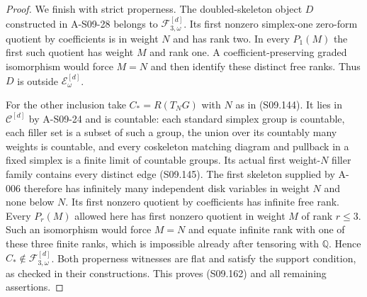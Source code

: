 \begin{proof}
We finish with strict properness. The doubled-skeleton object
$D$ constructed in A-S09-28 belongs to
$\mathcal F_{3,\omega}^{[d]}$. Its first nonzero
simplex-one zero-form quotient by coefficients is in
weight $N$ and has rank two. In every $P_1(M)$ the
first such quotient has weight $M$ and rank one.
A coefficient-preserving graded isomorphism would force
$M=N$ and then identify these distinct free ranks.
Thus $D$ is outside $\mathcal E_\omega^{[d]}$.

For the other inclusion take $C_*=R(T_NG)$ with $N$
as in (S09.144). It lies in $\mathcal C^{[d]}$ by
A-S09-24 and is countable: each standard simplex group
is countable, each filler set is a subset of such a
group, the union over its countably many weights is
countable, and every coskeleton matching diagram and
pullback in a fixed simplex is a finite limit of
countable groups. Its actual first weight-$N$ filler
family contains every distinct edge (S09.145).
The first skeleton supplied by A-006 therefore has
infinitely many independent disk variables in weight
$N$ and none below $N$. Its first nonzero quotient
by coefficients has infinite free rank. Every
$P_r(M)$ allowed here has first nonzero quotient in
weight $M$ of rank $r\leq3$. Such an isomorphism
would force $M=N$ and equate infinite rank with one
of these three finite ranks, which is impossible
already after tensoring with $\mathbb Q$.
Hence $C_*\notin\mathcal F_{3,\omega}^{[d]}$.
Both properness witnesses are flat and satisfy the
support condition, as checked in their constructions.
This proves (S09.162) and all remaining assertions.
\end{proof}
